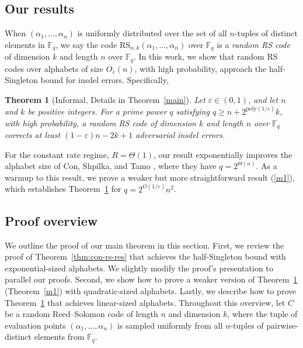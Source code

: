 \documentclass[11pt]{article}
\theoremstyle{plain}
\newtheorem{thm}{Theorem}
\theoremstyle{definition}
\theoremstyle{remark}
\newcommand{\F}{\mathbb{F}}
\renewcommand{\epsilon}{\varepsilon}
\newcommand{\Fq}{\mathbb{F}_q}
\begin{document}
\subsection{Our results}

When $(\alpha_1, \ldots, \alpha_n)$ is uniformly distributed over the set of all $n$-tuples of distinct elements in $\F_q$, we say the code $\text{RS}_{n,k}(\alpha_1, \ldots, \alpha_n)$ over $\Fq$ is a \emph{random RS code} of dimension $k$ and length $n$ over $\Fq$.
In this work, we 
show that random RS codes over alphabets of size $O_{\varepsilon}(n)$, with high probability, approach the half-Singleton bound for insdel errors.
Specifically, 
\begin{thm}[Informal, Details in Theorem~\ref{main}]\label{main2}
Let $\varepsilon\in (0,1)$, and let $n$ and $k$ be positive integers. 
For a prime power $q$ satisfying $q\ge n+ 2^{\mathrm{poly}(1/\epsilon)}k$, with high probability, a random RS code of dimension $k$ and length $n$ over $\Fq$ corrects at least 
$ (1-\epsilon)n-2k+1$ adversarial insdel errors.
\end{thm}

    For the constant rate regime, $R=\Theta(1)$, our result exponentially improves the alphabet size of Con, Shpilka, and Tamo \cite{con2023reed}, where they have $q=2^{\Theta(n)}$.
    As a warmup to this result, we prove a weaker but more straightforward result (\cref{m1}), which establishes Theorem~\ref{main2} for $q=2^{O(1/\varepsilon)}n^2$.









\subsection{Proof overview}
\label{sec:proof-overview}
We outline the proof of our main theorem in this section. 
First, we review the proof of Theorem~\ref{thm:con-rs-res} \cite{con2023reed} that achieves the half-Singleton bound with exponential-sized alphabets. 
We slightly modify the proof's presentation to parallel our proofs.
Second, we show how to prove a weaker version of Theorem~\ref{main2} (Theorem~\ref{m1}) with quadratic-sized alphabets.
Lastly, we describe how to prove Theorem~\ref{main2} that achieves linear-sized alphabets.
Throughout this overview, let $C$ be a random Reed--Solomon code of length $n$ and dimension $k$, where the tuple of evaluation points $(\alpha_1,\dots,\alpha_n)$ is sampled uniformly from all $n$-tuples of pairwise-distinct elements from $\mathbb{F}_q$.
\end{document}
